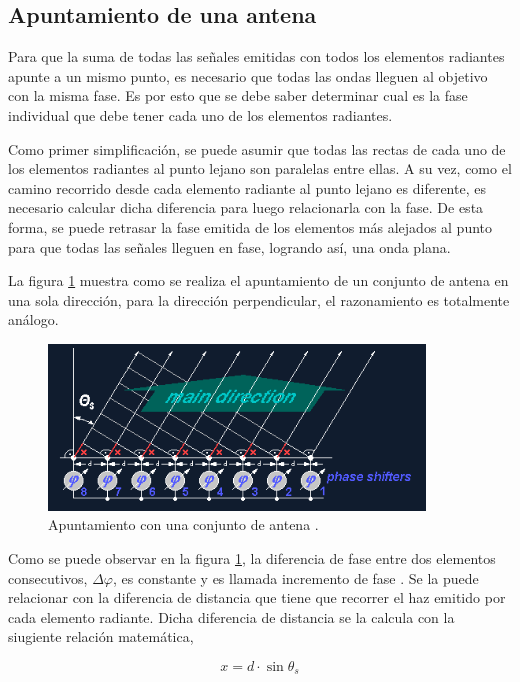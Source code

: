 \subsection{Apuntamiento de una antena}\label{ssec:beamSteering}

Para que la suma de todas las señales emitidas con todos los elementos radiantes apunte a un mismo punto, es necesario que
todas las ondas lleguen al objetivo con la misma fase. Es por esto que se debe saber determinar cual es la fase individual que
debe tener cada uno de los elementos radiantes.

Como primer simplificación, se puede asumir que todas las rectas de cada uno de los elementos radiantes al punto lejano son
paralelas entre ellas. A su vez, como el camino recorrido desde cada elemento radiante al punto lejano es diferente, es
necesario calcular dicha diferencia para luego relacionarla con la fase. De esta forma, se puede retrasar la fase emitida de
los elementos más alejados al punto para que todas las señales lleguen en fase, logrando así, una onda plana.

La figura \ref{fig:beamSteering} muestra como se realiza el apuntamiento de un conjunto de antena en una sola dirección,
para la dirección perpendicular, el razonamiento es totalmente análogo.

\begin{figure}[H]
 \centering
 \includegraphics[width=10cm]{gfx/beamSteering.png}
 \caption{Apuntamiento con una conjunto de antena \cite{BeamSteering}.}
 \label{fig:beamSteering}
\end{figure}

Como se puede observar en la figura \ref{fig:beamSteering}, la diferencia de fase entre dos elementos consecutivos,
$\Delta\varphi$, es constante y es llamada incremento de fase \cite{BeamSteering}. Se la puede relacionar con la diferencia
de distancia que tiene que recorrer el haz emitido por cada elemento radiante. Dicha diferencia de distancia se la calcula con
la siugiente relación matemática,


\begin{equation}
	x = d\cdot \sin{\theta_s}
	\label{eq:steering}
\end{equation}

